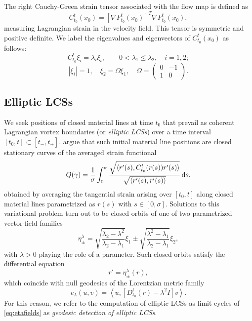 \documentclass[5p]{elsarticle}
\begin{document}
The right Cauchy-Green strain tensor associated with the flow map is defined as
\begin{equation}
C_{t_0}^t(x_0) = \left[\nabla F_{t_0}^t(x_0)\right]^T \nabla F_{t_0}^t(x_0),
\label{eq:CG}
\end{equation}
measuring Lagrangian strain in the velocity field. This tensor is symmetric and positive definite\citep{truesdell04}. We label the eigenvalues and eigenvectors of $C_{t_0}^t(x_0)$ as follows:
\[
C_{t_0}^t \xi_i = \lambda_i \xi_i, \qquad 0 < \lambda_1 \leq \lambda_2, \quad i = 1,2;
\]
\begin{equation}
\left|\xi_i\right| = 1, \quad \xi_2 = \Omega \xi_1, \quad \Omega = \left(
\begin{array}{rr}
0 & -1\\
1 & 0
\end{array}
\right).
\label{eq:CG_invariants}
\end{equation}

\subsection{Elliptic LCSs}
\label{sec:Elliptic LCSs}

We seek positions of closed material lines at time $t_0$ that prevail as coherent Lagrangian vortex boundaries (or \emph{elliptic LCSs}) over a time interval $[t_0,t]\subset[t_-,t_+]$. \citet{haller13:_coher_lagran,haller14:_adden_coher_lagran} argue that such initial material line positions are closed stationary curves of the averaged strain functional
\[
Q(\gamma) = \frac{1}{\sigma} \int_0^{\sigma} \frac{\sqrt{\langle r'(s),C_{t_0}^t(r(s))r'(s)\rangle}}{\sqrt{\langle r'(s),r'(s)\rangle}} \dif s,
\]
obtained by averaging the tangential strain arising over $[t_0,t]$ along closed material lines parametrized as $r(s)$ with $s \in [0,\sigma].$
Solutions to this variational problem turn out to be closed orbits of one of two parametrized vector-field families
\begin{equation}
\eta_\pm^\lambda = \sqrt{\frac{\lambda_2 - \lambda^2}{\lambda_2 - \lambda_1}} \xi_1 \pm \sqrt{\frac{\lambda^2 - \lambda_1}{\lambda_2 - \lambda_1}}\xi_2,
\label{eq:eta}
\end{equation}
with $\lambda > 0$ playing the role of a parameter. Such closed orbits satisfy the differential equation
\begin{equation}
r' = \eta_\pm^\lambda(r),
\label{eq:etafields}
\end{equation}
which coincide with null geodesics of the Lorentzian metric family
\[
e_\lambda(u,v) = \left\langle u,\left[D_{t_0}^t(r) - \lambda^2 I\right] v \right\rangle.
\]
For this reason, we refer to the computation of elliptic LCSs as limit cycles of \cref{eq:etafields} as \emph{geodesic detection of elliptic LCSs}.
\end{document}
